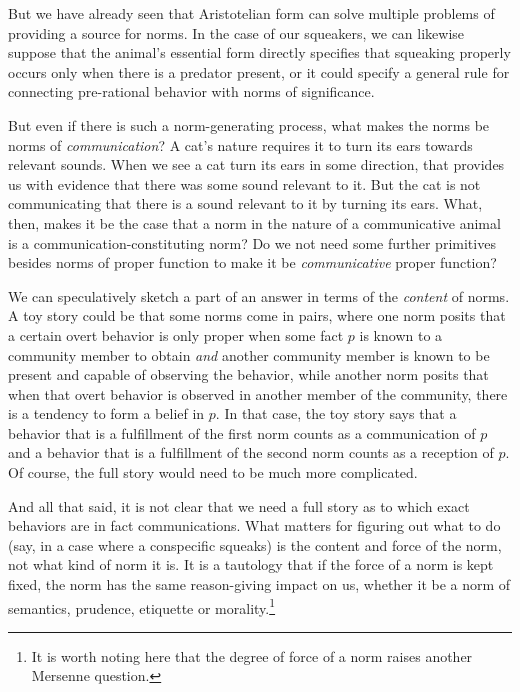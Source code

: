 But we have already seen that Aristotelian form can solve multiple problems of providing a source for norms.
In the case of our squeakers, we can likewise suppose that the animal's essential form directly specifies that squeaking properly occurs only when there is a 
predator present, or it could specify a general rule for connecting pre-rational behavior with norms of significance. 

But even if there is such a norm-generating process, what makes the norms be norms of \textit{communication}? A cat's nature 
requires it to turn its ears towards relevant sounds. When we see a cat turn its ears in some direction, that provides us with 
evidence that there was some sound relevant to it. But the cat is not communicating that there is a sound relevant to it by
turning its ears. What, then, makes it be the case that a norm in the nature of a communicative animal is a communication-constituting
norm? Do we not need some further primitives besides norms of proper function to make it be \textit{communicative} proper function?

We can speculatively sketch a part of an answer in terms of the \textit{content} of norms. A toy story could be that 
some norms come in pairs, where one norm posits that a certain overt behavior is only proper when some fact $p$ is known to a 
community member to obtain \textit{and} another community member is known to be present and capable of observing the behavior, while 
another 
norm posits that when that overt behavior is observed in another member of the community, there is a tendency to form a belief 
in $p$. In that case, the toy story says that a behavior that is a fulfillment of the first norm counts as a communication 
of $p$ and a behavior that is a fulfillment of the second norm counts as a reception of $p$. Of course, the full story would need
to be much more complicated.

And all that said, it is not clear that we need a full story as to which exact behaviors are in fact communications. What matters
for figuring out what to do (say, in a case where a conspecific squeaks) is the 
content and force of the norm, not what kind of norm it is. It is a tautology that if the 
force of a norm is kept fixed, the norm has the same reason-giving impact on us, whether it be a norm of semantics, prudence, 
etiquette or morality.\footnote{It is worth noting here that the degree of force
of a norm raises another Mersenne question.}


